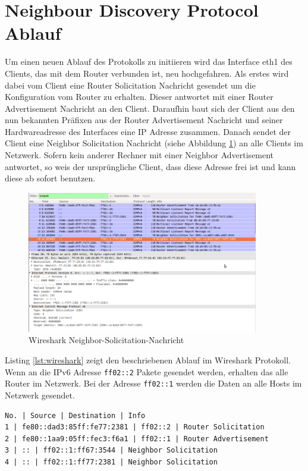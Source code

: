 \documentclass[a4paper,12pt]{article} %
\begin{document}
\section{Neighbour Discovery Protocol Ablauf}
Um einen neuen Ablauf des Protokolls zu initiieren wird das Interface eth1 des Clients, das mit dem Router verbunden ist, neu hochgefahren. Als erstes wird dabei vom Client eine Router Solicitation Nachricht gesendet um die Konfiguration vom Router zu erhalten. Dieser antwortet mit einer Router Advertisement Nachricht an den Client. Daraufhin baut sich der Client aus den nun bekannten Präfixen aus der Router Advertisement Nachricht und seiner Hardwareadresse des Interfaces eine IP Adresse zusammen. Danach sendet der Client eine Neighbor Solicitation Nachricht (siehe Abbildung \ref{fig:wireshark:neighbor-solicitation}) an alle Clients im Netzwerk. Sofern kein anderer Rechner mit einer Neighbor Advertisement antwortet, so weis der ursprüngliche Client, dass diese Adresse frei ist und kann diese ab sofort benutzen.

\begin{figure}[H]
	\centering
		\includegraphics[width=0.90\textwidth]{img/wireshark-neighbor-solicitation.png}
	\caption{Wireshark Neighbor-Solicitation-Nachricht}
	\label{fig:wireshark:neighbor-solicitation}
\end{figure}

Listing \ref{lst:wireshark} zeigt den beschriebenen Ablauf im Wireshark Protokoll. Wenn an die IPv6 Adresse \verb!ff02::2! Pakete gesendet werden, erhalten das alle Router im Netzwerk. Bei der Adresse \verb!ff02::1! werden die Daten an alle Hosts im Netzwerk gesendet.

\begin{lstlisting}[style=code,caption={Wireshark},label=lst:wireshark]
No. | Source | Destination | Info
1 | fe80::dad3:85ff:fe77:2381 | ff02::2 | Router Solicitation
2 | fe80::1aa9:05ff:fec3:f6a1 | ff02::1 | Router Advertisement
3 | :: | ff02::1:ff67:3544 | Neighbor Solicitation
4 | :: | ff02::1:ff77:2381 | Neighbor Solicitation
\end{lstlisting}
\end{document}
